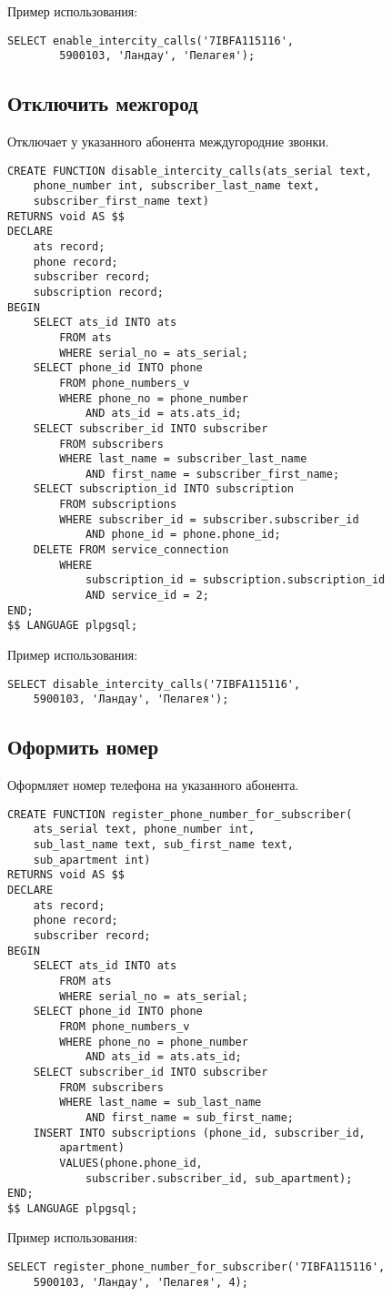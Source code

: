 \documentclass{report}
\begin{document}
Пример использования:
\begin{lstlisting}
SELECT enable_intercity_calls('7IBFA115116',
        5900103, 'Ландау', 'Пелагея');
\end{lstlisting}

\subsection*{Отключить межгород}

Отключает у указанного абонента междугородние звонки.

\begin{lstlisting}
CREATE FUNCTION disable_intercity_calls(ats_serial text, 
    phone_number int, subscriber_last_name text, 
    subscriber_first_name text) 
RETURNS void AS $$
DECLARE
    ats record;
    phone record;
    subscriber record;
    subscription record;
BEGIN
    SELECT ats_id INTO ats 
        FROM ats 
        WHERE serial_no = ats_serial;
    SELECT phone_id INTO phone
        FROM phone_numbers_v 
        WHERE phone_no = phone_number
            AND ats_id = ats.ats_id;
    SELECT subscriber_id INTO subscriber
        FROM subscribers
        WHERE last_name = subscriber_last_name
            AND first_name = subscriber_first_name;
    SELECT subscription_id INTO subscription
        FROM subscriptions
        WHERE subscriber_id = subscriber.subscriber_id
            AND phone_id = phone.phone_id;
    DELETE FROM service_connection
        WHERE 
            subscription_id = subscription.subscription_id
            AND service_id = 2;
END;
$$ LANGUAGE plpgsql;
\end{lstlisting}

Пример использования:
\begin{lstlisting}
SELECT disable_intercity_calls('7IBFA115116',
    5900103, 'Ландау', 'Пелагея');
\end{lstlisting}

\subsection*{Оформить номер}

Оформляет номер телефона на указанного абонента.

\begin{lstlisting}
CREATE FUNCTION register_phone_number_for_subscriber(
    ats_serial text, phone_number int, 
    sub_last_name text, sub_first_name text, 
    sub_apartment int) 
RETURNS void AS $$
DECLARE
    ats record;
    phone record;
    subscriber record;
BEGIN
    SELECT ats_id INTO ats 
        FROM ats 
        WHERE serial_no = ats_serial;
    SELECT phone_id INTO phone
        FROM phone_numbers_v
        WHERE phone_no = phone_number
            AND ats_id = ats.ats_id;
    SELECT subscriber_id INTO subscriber
        FROM subscribers
        WHERE last_name = sub_last_name
            AND first_name = sub_first_name;
    INSERT INTO subscriptions (phone_id, subscriber_id, 
        apartment)
        VALUES(phone.phone_id, 
            subscriber.subscriber_id, sub_apartment);
END;
$$ LANGUAGE plpgsql;
\end{lstlisting}

Пример использования:
\begin{lstlisting}
SELECT register_phone_number_for_subscriber('7IBFA115116',
    5900103, 'Ландау', 'Пелагея', 4);
\end{lstlisting}
\end{document}
